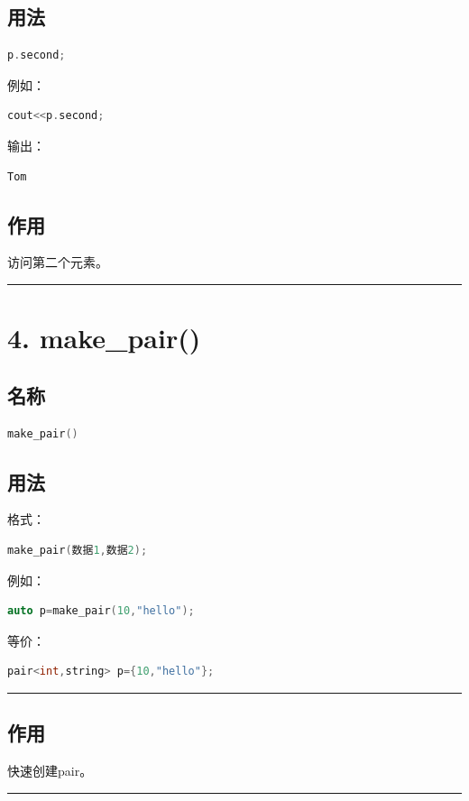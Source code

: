 \documentclass[9pt,twocolumn]{extarticle}
\begin{document}
\subsection{用法}
\begin{lstlisting}[language=C++]
p.second;
\end{lstlisting}
例如：
\begin{lstlisting}[language=C++]
cout<<p.second;
\end{lstlisting}
输出：
\begin{lstlisting}
Tom
\end{lstlisting}

\subsection{作用}
访问第二个元素。

\noindent\rule{\linewidth}{0.4pt}

\section{4. make\_pair()}

\subsection{名称}
\begin{lstlisting}[language=C++]
make_pair()
\end{lstlisting}

\subsection{用法}
格式：
\begin{lstlisting}[language=C++]
make_pair(数据1,数据2);
\end{lstlisting}
例如：
\begin{lstlisting}[language=C++]
auto p=make_pair(10,"hello");
\end{lstlisting}
等价：
\begin{lstlisting}[language=C++]
pair<int,string> p={10,"hello"};
\end{lstlisting}

\noindent\rule{\linewidth}{0.4pt}

\subsection{作用}
快速创建pair。

\noindent\rule{\linewidth}{0.4pt}
\end{document}
